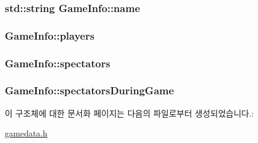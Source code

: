 \hypertarget{struct_game_info_a2636537f5709e2f0a492e21f46d63902}{
\subsubsection[{name}]{\setlength{\rightskip}{0pt plus 5cm}std\-::string Game\-Info\-::name}}\label{struct_game_info_a2636537f5709e2f0a492e21f46d63902}
\hypertarget{struct_game_info_abae703a83db0cab47682304c2f5175bf}{
\subsubsection[{players}]{ Game\-Info\-::players}}\label{struct_game_info_abae703a83db0cab47682304c2f5175bf}
\hypertarget{struct_game_info_a512e7504e87265d990be1fc6d6a3b07e}{
\subsubsection[{spectators}]{ Game\-Info\-::spectators}}\label{struct_game_info_a512e7504e87265d990be1fc6d6a3b07e}
\hypertarget{struct_game_info_a24be82c5206c45ff9f08fa9896783332}{
\subsubsection[{spectators\-During\-Game}]{ Game\-Info\-::spectators\-During\-Game}}\label{struct_game_info_a24be82c5206c45ff9f08fa9896783332}


이 구조체에 대한 문서화 페이지는 다음의 파일로부터 생성되었습니다.\-:\begin{DoxyCompactItemize}
\item 
\hyperlink{gamedata_8h}{gamedata.\-h}\end{DoxyCompactItemize}
